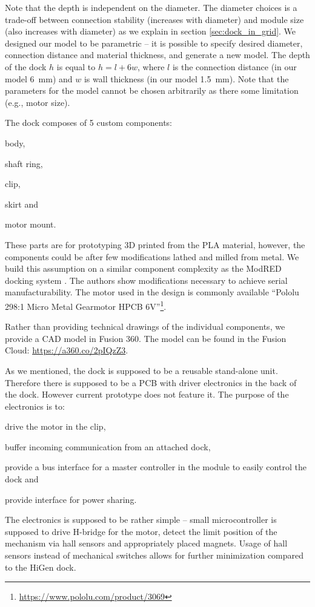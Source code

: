 Note that the depth is independent on the diameter. The diameter choices is a
trade-off between connection stability (increases with diameter) and module size
(also increases with diameter) as we explain in section \ref{sec:dock_in_grid}.
We designed our model to be parametric -- it is possible to specify desired
diameter, connection distance and material thickness, and generate a new model.
The depth of the dock $h$ is equal to $h=l+6w$, where $l$ is the connection
distance (in our model 6~mm) and $w$ is wall thickness (in our model 1.5~mm).
Note that the parameters for the model cannot be chosen arbitrarily as there
some limitation (e.g., motor size).

The dock composes of 5 custom components:
\begin{enumerate*}
    \item body,
    \item shaft ring,
    \item clip,
    \item skirt and
    \item motor mount.
\end{enumerate*}
These parts are for prototyping 3D printed from the PLA material, however, the
components could be after few modifications lathed and milled from metal. We
build this assumption on a similar component complexity as the ModRED docking
system \cite{hossain_towards_2014}. The authors show modifications necessary to
achieve serial manufacturability. The motor used in the design is commonly
available ``Pololu 298:1 Micro Metal Gearmotor HPCB
6V''\footnote{\url{https://www.pololu.com/product/3069}}.

Rather than providing technical drawings of the individual components, we
provide a CAD model in Fusion 360. The model can be found in the Fusion Cloud:
\url{https://a360.co/2pIQzZ3}.

As we mentioned, the dock is supposed to be a reusable stand-alone unit.
Therefore there is supposed to be a PCB with driver electronics in the back of
the dock. However current prototype does not feature it. The purpose of the
electronics is to:
\begin{enumerate*}
    \item drive the motor in the clip,
    \item buffer incoming communication from an attached dock,
    \item provide a bus interface for a master controller in the module to
    easily control the dock and
    \item provide interface for power sharing.
\end{enumerate*}
The electronics is supposed to be rather simple -- small microcontroller is
supposed to drive H-bridge for the motor, detect the limit position of the
mechanism via hall sensors and appropriately placed magnets. Usage of hall
sensors instead of mechanical switches allows for further minimization compared
to the HiGen dock.

